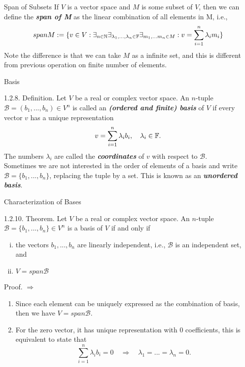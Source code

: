 \documentclass[hyperref={pdfpagelabels=true}]{beamer}
\newcommand{\N}{\mathbb{N}}
\newcommand{\highlightg}[1]{\textcolor[rgb]{0.1,0.5,0.3}{\emph{\textbf{#1}}}}
\newcommand{\structb}[1]{\textcolor[rgb]{0.2,0.2,0.7}{#1}}
\newcommand{\<}{\langle}
\renewcommand{\>}{\rangle}
\begin{document}
\begin{frame}{Span of Subsets}
    If $V$ is a vector space and $M$ is some subset of $V$, then we can define the \highlightg{span of M} as the linear combination of all elements in M, i.e.,
    $$spanM := \{v \in V: \exists _{n \in \N} \exists_{\lambda_1,...,\lambda_{n} \in \F} \exists_{m_1,...m_n \in M}: v = \sum_{i = 1}^{n}\lambda_{i}m_{i}\}$$
    Note the difference is that we can take $M$ as a infinite set, and this is different from previous operation on finite number of elements.
\end{frame}
\begin{frame}{Basis}
    \begin{block}{1.2.8. Definition.}
        Let $V$ be a real or complex vector space. An $n$-tuple $\mathcal{B} = (b_1,...,b_n) \in V^{n}$ is called an \highlightg{(ordered and finite) basis} of $V$ if every vector $v$ has a unique representation
        \[v = \sum_{i = 1}^{n}\lambda_{i}b_{i}, \quad \lambda_i \in \mathbb{F}.\]
        The numbers $\lambda_i$ are called the \highlightg{coordinates} of $v$ with respect to $\mathcal{B}$.\\
        Sometimes we are not interested in the order of elements of a basis and write $\mathcal{B} = \{b_1,...,b_n\}$, replacing the tuple by a set. This is known as an \highlightg{unordered basis}.
    \end{block}
\end{frame}
\begin{frame}{Characterization of Bases}
    \begin{block}{1.2.10. Theorem.}
        Let $V$ be a real or complex vector space. An $n$-tuple $\mathcal{B} = \{b_1,...,b_n\} \in V^{n}$ is a basis of $V$ if and only if 
        \begin{enumerate}[(i)]
            \item the vectors $b_1,...,b_n$ are linearly independent, i.e., $\mathcal{B}$ is an independent set, and
            \item $V = span\mathcal{B}$ 
        \end{enumerate}
    \end{block}
    \begin{block}{Proof.}
        \structb{$\Rightarrow$} 
        \begin{enumerate} 
            \item Since each element can be uniquely expressed as the combination of basis, then we have $V = span\mathcal{B}$.
            \item For the zero vector, it has unique representation with 0 coefficients, this is equivalent to state that 
            \[\sum_{i = 1}^{n}\lambda_{i}b_{i} = 0 \quad \Rightarrow \quad \lambda_{1} = ... = \lambda_{n} = 0.\]
        \end{enumerate}
    \end{block}
\end{frame}
\end{document}
